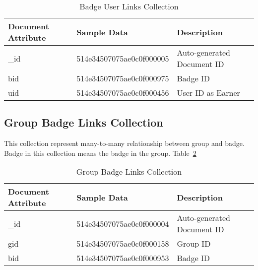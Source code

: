 \begin{table}[H]
\caption{Badge User Links Collection}\label{table:BadgeUserLinksCollection}
\textbf{ }
\begin{center}
\begin{tabular}{ | l | l |  l | }
\hline
Document Attribute & Sample Data & Description \\ \hline
{\_}id & 514e34507075ae0c0f000005 & Auto-generated Document ID \\ \hline
bid & 514e34507075ae0c0f000975 & Badge ID   \\ \hline
uid & 514e34507075ae0c0f000456 & User ID as Earner   \\ \hline
\end{tabular}
\end{center}
\end{table}


\subsection{Group Badge Links Collection}
This collection represent many-to-many relationship between group and badge. Badge in this collection means the badge in the group. Table~\ref{table:GroupBadgeLinksCollection}

\begin{table}[H]
\caption{Group Badge Links Collection}\label{table:GroupBadgeLinksCollection}
\textbf{ }
\begin{center}
\begin{tabular}{ | l | l |  l | }
\hline
Document Attribute & Sample Data & Description \\ \hline
{\_}id & 514e34507075ae0c0f000004 & Auto-generated Document ID \\ \hline
gid & 514e34507075ae0c0f000158 & Group ID   \\ \hline
bid & 514e34507075ae0c0f000953 & Badge ID    \\ \hline
\end{tabular}
\end{center}
\end{table}

